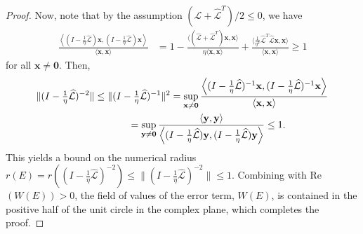 \documentclass[review]{siamart}
\begin{document}
\begin{proof}
Now, note that by the assumption $(\widehat{\mathcal{L}}+\widehat{\mathcal{L}}^T)/2 \leq 0$, we have
%
\begin{align}\label{eq:norm1}
\frac{\left\langle (I - \tfrac{1}{\eta}\widehat{\mathcal{L}})\mathbf{x},(I - \tfrac{1}{\eta}\widehat{\mathcal{L}})\mathbf{x}\right\rangle}
	{\langle\mathbf{x},\mathbf{x}\rangle}
& = 1 - \frac{\langle (\widehat{\mathcal{L}} + \widehat{\mathcal{L}}^T )
	\mathbf{x},\mathbf{x}\rangle}{\eta \langle\mathbf{x},\mathbf{x}\rangle} +
	\frac{\langle \tfrac{1}{\eta^2}\widehat{\mathcal{L}}^T\widehat{\mathcal{L}}\mathbf{x},
	\mathbf{x}\rangle}{\langle\mathbf{x},\mathbf{x}\rangle}
\geq 1
\end{align}
%
for all $\mathbf{x}\neq\mathbf{0}$. Then,
%
\begin{align*}
\|(I - \tfrac{1}{\eta}\widehat{\mathcal{L}})^{-2}\| \leq \|(I - \tfrac{1}{\eta}\widehat{\mathcal{L}})^{-1}\|^2
& = \sup_{\mathbf{x}\neq\mathbf{0}}
	\frac{\left\langle (I - \tfrac{1}{\eta}\widehat{\mathcal{L}})^{-1}\mathbf{x},
	(I - \tfrac{1}{\eta}\widehat{\mathcal{L}})^{-1}\mathbf{x}\right\rangle}
	{\langle\mathbf{x},\mathbf{x}\rangle} \\
&\hspace{-10ex}= \sup_{\mathbf{y}\neq\mathbf{0}}
	\frac{\langle\mathbf{y},\mathbf{y}\rangle}{\left\langle (I - \tfrac{1}{\eta}\widehat{\mathcal{L}})\mathbf{y},
	(I - \tfrac{1}{\eta}\widehat{\mathcal{L}})\mathbf{y}\right\rangle}
\leq 1.
\end{align*}
%
This yields a bound on the numerical radius $r(E) = r((I - \tfrac{1}{\eta}\widehat{\mathcal{L}})^{-2})
\leq \|(I - \tfrac{1}{\eta}\widehat{\mathcal{L}})^{-2}\|\leq 1$. Combining with Re$(W(E)) > 0$,
the field of values of the error term, $W(E)$, is contained in the positive half of the
unit circle in the complex plane, which completes the proof.
\end{proof}
%
\end{document}
